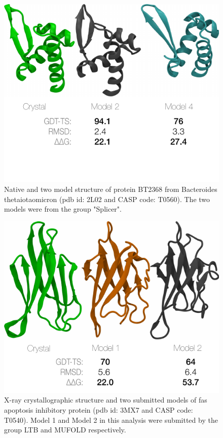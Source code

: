 \documentclass[12pt]{article}
\begin{document}
\begin{figure}
\begin{center}
\includegraphics[width=3.5 in,height=3.0 in]{T0560.pdf}
\end{center}
\caption{Native and two model structure of protein BT2368 from Bacteroides thetaiotaomicron (pdb id: 2L02 and CASP code: T0560). The two models
were from the group "Splicer".}
\label{fig:T0560}
\end{figure}

\begin{figure}
\begin{center}
\includegraphics[width=3.5 in,height=3.0 in]{T0540.pdf}
\end{center}
\caption{X-ray crystallographic structure and two submitted models of fas apoptosis inhibitory protein (pdb id: 3MX7 and CASP code: T0540). 
Model 1 and Model 2 in this analysis were submitted by the group LTB and MUFOLD respectively.}
\label{fig:T0540}
\end{figure}
\end{document}
